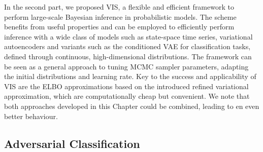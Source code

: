 In the second part, we  proposed VIS, a flexible and efficient framework to perform
large-scale Bayesian inference in probabilistic models. The scheme benefits from useful properties and can be 
employed to efficiently perform inference with a wide class of models such as state-space time series, variational autoencoders {and variants such as the conditioned VAE for classification tasks}, defined through continuous, high-dimensional distributions.
The framework can be seen as a general 
approach to tuning MCMC sampler parameters, adapting the initial distributions and learning rate. %
Key to the success and applicability of  VIS  are the ELBO approximations based on the introduced refined variational approximation, which are computationally cheap but convenient. We note that both approaches developed in this Chapter could be combined, leading to en even better behaviour.

\subsection{Adversarial Classification}

